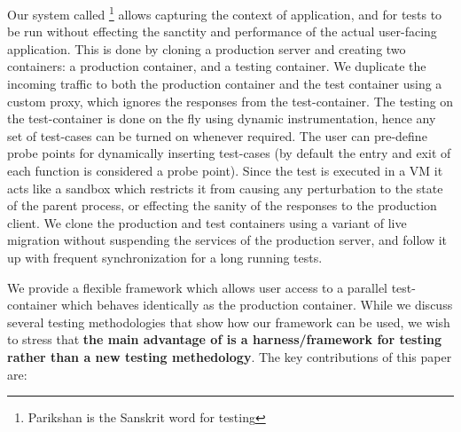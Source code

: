  Our system called \parikshan\footnote{Parikshan is the Sanskrit word for testing} allows capturing the context of application, 
and for tests to be run without effecting the sanctity and performance of the actual user-facing application. 
This is done by cloning a production server and creating two containers: a production container, and a testing container. 
We duplicate the incoming traffic to both the production container and the test container using a custom proxy, which ignores the responses from the test-container. 
The testing on the test-container is done on the fly using dynamic instrumentation, hence any set of test-cases can be turned on whenever required. 
The user can pre-define probe points for dynamically inserting test-cases (by default the entry and exit of each function is considered a probe point).
Since the test is executed in a VM it acts like a sandbox which restricts it from causing any perturbation to the state of the parent process, or effecting the sanity of the responses to the production client. 
We clone the production and test containers using a variant of live migration without suspending the services of the production server, and follow it up with frequent synchronization for a long running tests.

We provide a flexible framework which allows user access to a parallel test-container which behaves identically as the production container. 
While we discuss several testing methodologies that show how our framework can be used, 
we wish to stress that \textbf{the main advantage of \parikshan is a harness/framework for testing rather than a new testing methedology}. 
The key contributions of this paper are:

